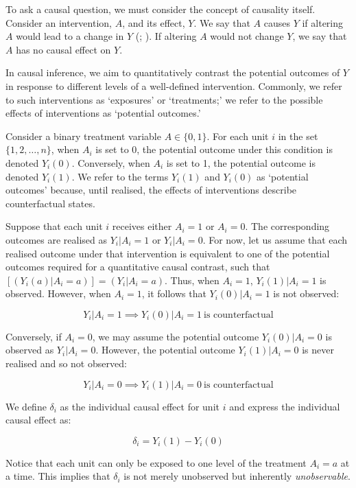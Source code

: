\documentclass[
  single column]{article}
\begin{document}
To ask a causal question, we must consider the concept of causality
itself. Consider an intervention, \(A\), and its effect, \(Y\). We say
that \(A\) causes \(Y\) if altering \(A\) would lead to a change in
\(Y\) (;
). If altering \(A\) would not
change \(Y\), we say that \(A\) has no causal effect on \(Y\).

In causal inference, we aim to quantitatively contrast the potential
outcomes of \(Y\) in response to different levels of a well-defined
intervention. Commonly, we refer to such interventions as `exposures' or
`treatments;' we refer to the possible effects of interventions as
`potential outcomes.'

Consider a binary treatment variable \(A \in \{0,1\}\). For each unit
\(i\) in the set \(\{1, 2, \ldots, n\}\), when \(A_i\) is set to 0, the
potential outcome under this condition is denoted \(Y_i(0)\).
Conversely, when \(A_i\) is set to 1, the potential outcome is denoted
\(Y_i(1)\). We refer to the terms \(Y_i(1)\) and \(Y_i(0)\) as
`potential outcomes' because, until realised, the effects of
interventions describe counterfactual states.

Suppose that each unit \(i\) receives either \(A_i = 1\) or \(A_i = 0\).
The corresponding outcomes are realised as \(Y_i|A_i = 1\) or
\(Y_i|A_i = 0\). For now, let us assume that each realised outcome under
that intervention is equivalent to one of the potential outcomes
required for a quantitative causal contrast, such that
\([(Y_i(a)|A_i = a)] = (Y_i|A_i = a)\). Thus, when \(A_i = 1\),
\(Y_i(1)|A_i = 1\) is observed. However, when \(A_i = 1\), it follows
that \(Y_i(0)|A_i = 1\) is not observed:

\[
Y_i|A_i = 1 \implies Y_i(0)|A_i = 1~ \text{is counterfactual}
\]

Conversely, if \(A_i = 0\), we may assume the potential outcome
\(Y_i(0)|A_i = 0\) is observed as \(Y_i|A_i = 0\). However, the
potential outcome \(Y_i(1)|A_i = 0\) is never realised and so not
observed:

\[
Y_i|A_i = 0 \implies Y_i(1)|A_i = 0~ \text{is counterfactual}
\]

We define \(\delta_i\) as the individual causal effect for unit \(i\)
and express the individual causal effect as:

\[
\delta_i = Y_i(1) - Y_i(0)
\]

Notice that each unit can only be exposed to one level of the treatment
\(A_i = a\) at a time. This implies that \(\delta_i\) is not merely
unobserved but inherently \emph{unobservable}.
\end{document}
